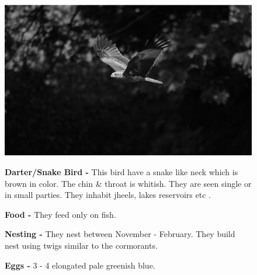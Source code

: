 \begin{figure}[H]
\begin{center}
\includegraphics{figure/Land_birds/01_pariah_kite/pariah-kite.eps}
\end{center}
\medskip
\noindent
{\bf Darter/Snake Bird -} This bird have a snake like neck which is brown in color. The chin \& throat is whitish. They are seen single or in small parties. They inhabit jheels, lakes reservoirs etc .

\medskip
{\bf Food -} They feed only on fish. 

{\bf Nesting -} They nest between November - February. They build nest using twigs similar to the cormorants.

{\bf Eggs -} 3 - 4 elongated pale greenish blue.
\end{figure}

\vfill\eject

~\phantom{a}
\vfill

